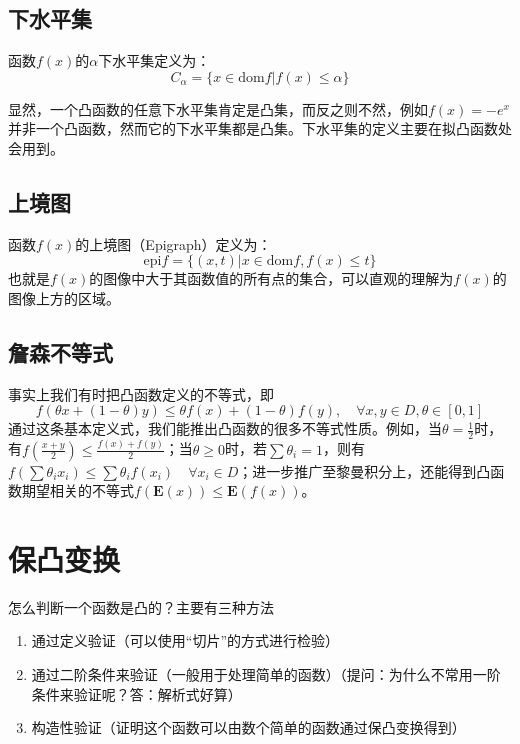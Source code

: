 \documentclass[12pt,a4paper]{book}
\begin{document}
\subsection{下水平集}

函数$f(x)$的$\alpha$下水平集定义为：
\begin{equation}
C_\alpha = \{x\in\text{dom}f|f(x)\leq\alpha\}
\end{equation}

显然，一个凸函数的任意下水平集肯定是凸集，而反之则不然，例如$f(x)=-e^x$并非一个凸函数，然而它的下水平集都是凸集。下水平集的定义主要在拟凸函数处会用到。

\subsection{上境图}

函数$f(x)$的上境图（Epigraph）定义为：
\begin{equation}
\text{epi} f = \{(x,t)|x\in \text{dom}f,f(x)\leq t\}
\end{equation}
也就是$f(x)$的图像中大于其函数值的所有点的集合，可以直观的理解为$f(x)$的图像上方的区域。

\subsection{詹森不等式}

事实上我们有时把凸函数定义的不等式，即
$$f(\theta x +(1-\theta)y)\leq \theta f(x) + (1-\theta)f(y),\quad \forall x,y\in D, \theta\in [0,1]$$
通过这条基本定义式，我们能推出凸函数的很多不等式性质。例如，当$\theta = \frac{1}{2}$时，有$f(\frac{x+y}{2})\leq \frac{f(x)+f(y)}{2}$；当$\theta\geq 0$时，若$\sum \theta_i = 1$，则有$f(\sum\theta_i x_i)\leq \sum\theta_i f(x_i)\quad \forall x_i\in D$；进一步推广至黎曼积分上，还能得到凸函数期望相关的不等式$f(\mathbf{E} (x))\leq \mathbf{E} (f(x))$。


\section{保凸变换}

怎么判断一个函数是凸的？主要有三种方法

\begin{enumerate}
    \item 通过定义验证（可以使用“切片”的方式进行检验）
    \item 通过二阶条件来验证（一般用于处理简单的函数）（提问：为什么不常用一阶条件来验证呢？答：解析式好算）
    \item 构造性验证（证明这个函数可以由数个简单的函数通过保凸变换得到）
\end{enumerate}
\end{document}
